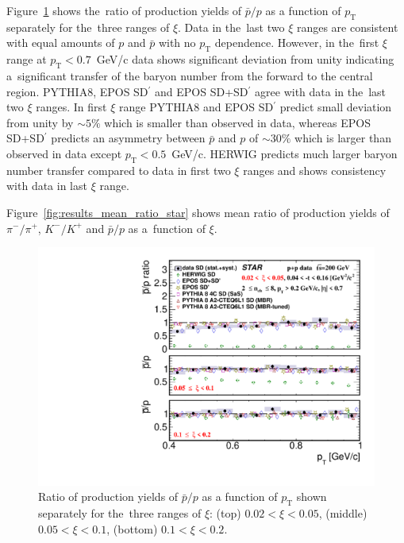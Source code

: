 Figure~\ref{fig:results_star_proton} shows the~ratio of production yields of $\bar{p}/p$ as a function of $p_\textrm{T}$  separately for the~three ranges of $\xi$. Data in the~last two $\xi$ ranges are consistent with equal amounts of $p$ and $\bar{p}$ with no $p_\textrm{T}$ dependence. However, in the~first $\xi$ range at $p_\textrm{T}<0.7$~GeV/c data shows significant deviation from unity indicating a~significant transfer of the baryon number from the forward to the central region. PYTHIA8, EPOS SD$^\prime$ and EPOS SD+SD$^\prime$ agree with data in the~last two $\xi$ ranges. In first $\xi$ range PYTHIA8 and EPOS SD$^\prime$ predict small deviation from unity by $\sim5\%$ which is smaller than observed in data, whereas EPOS SD+SD$^\prime$ predicts an asymmetry between $\bar{p}$ and $p$ of $\sim30\%$  which is larger than observed in data except $p_\textrm{T}<0.5$~GeV/c. HERWIG predicts much larger baryon number transfer compared to data in first two $\xi$ ranges and shows consistency with data in last $\xi$ range. 

Figure~\ref{fig:results_mean_ratio_star} shows mean ratio of production yields of $\pi^-/\pi^+$, $K^-/K^+$ and $\bar{p}/p$ as a~function of  $\xi$.

\begin{figure}[h!]
	\centering
	\includegraphics[width=.99\textwidth,page=1]{chapters/chrgSTAR/img/results/particleRatio_prt_2.pdf}
	\caption{Ratio of production yields of $\bar{p}/p$ as a function of $p_\textrm{T}$ shown separately for the~three ranges of $\xi$: (top) $0.02<\xi<0.05$, (middle) $0.05<\xi<0.1$, (bottom) $0.1<\xi<0.2$.}
	\label{fig:results_star_proton}
	
\end{figure}

